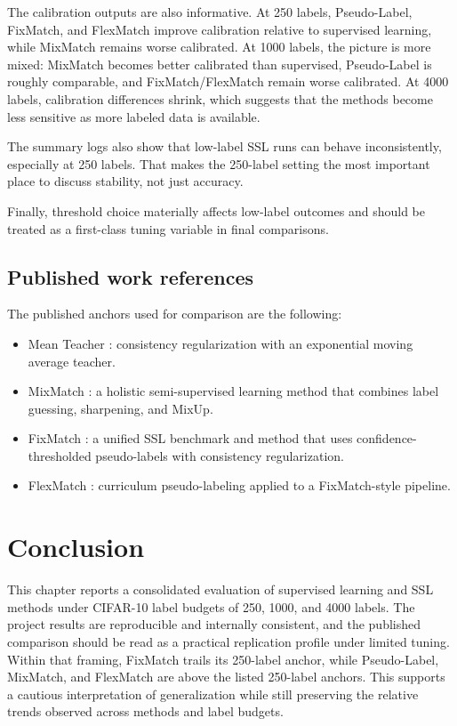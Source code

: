 The calibration outputs are also informative. At 250 labels, Pseudo-Label, FixMatch, and FlexMatch improve calibration relative to supervised learning, while MixMatch remains worse calibrated. At 1000 labels, the picture is more mixed: MixMatch becomes better calibrated than supervised, Pseudo-Label is roughly comparable, and FixMatch/FlexMatch remain worse calibrated. At 4000 labels, calibration differences shrink, which suggests that the methods become less sensitive as more labeled data is available.

The summary logs also show that low-label SSL runs can behave inconsistently, especially at 250 labels. That makes the 250-label setting the most important place to discuss stability, not just accuracy.

Finally, threshold choice materially affects low-label outcomes and should be treated as a first-class tuning variable in final comparisons.

\subsection{Published work references}

The published anchors used for comparison are the following:

\begin{itemize}
    \item Mean Teacher \cite{Reference3}: consistency regularization with an exponential moving average teacher.
    \item MixMatch \cite{Reference4}: a holistic semi-supervised learning method that combines label guessing, sharpening, and MixUp.
    \item FixMatch \cite{Reference5}: a unified SSL benchmark and method that uses confidence-thresholded pseudo-labels with consistency regularization.
    \item FlexMatch \cite{Reference7}: curriculum pseudo-labeling applied to a FixMatch-style pipeline.
\end{itemize}

\section{Conclusion}

This chapter reports a consolidated evaluation of supervised learning and SSL methods under CIFAR-10 label budgets of 250, 1000, and 4000 labels. The project results are reproducible and internally consistent, and the published comparison should be read as a practical replication profile under limited tuning. Within that framing, FixMatch trails its 250-label anchor, while Pseudo-Label, MixMatch, and FlexMatch are above the listed 250-label anchors. This supports a cautious interpretation of generalization while still preserving the relative trends observed across methods and label budgets.
